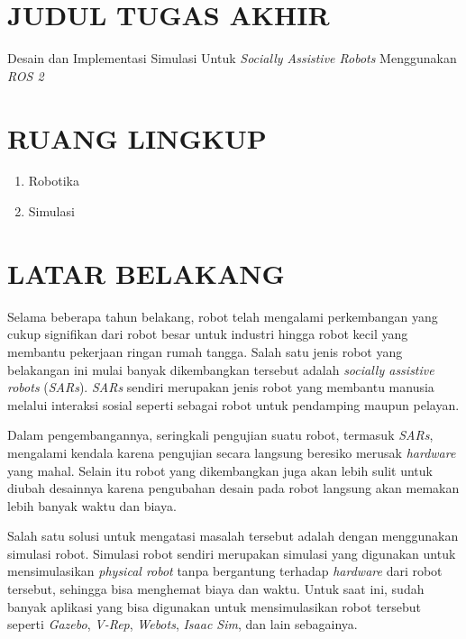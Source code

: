 \section{JUDUL TUGAS AKHIR}

Desain dan Implementasi Simulasi Untuk \emph{Socially Assistive Robots} Menggunakan \emph{ROS 2}
\vspace{0.5ex}

\section{RUANG LINGKUP}

\begin{enumerate}[nolistsep]
  \item Robotika
  \item Simulasi
\end{enumerate}

\section{LATAR BELAKANG}

Selama beberapa tahun belakang, robot telah mengalami perkembangan yang cukup signifikan dari robot besar untuk industri hingga robot kecil yang membantu pekerjaan ringan rumah tangga.
Salah satu jenis robot yang belakangan ini mulai banyak dikembangkan tersebut adalah \emph{socially assistive robots} (\emph{SARs}).
\emph{SARs} sendiri merupakan jenis robot yang membantu manusia melalui interaksi sosial seperti sebagai robot untuk pendamping maupun pelayan.

Dalam pengembangannya, seringkali pengujian suatu robot, termasuk \emph{SARs}, mengalami kendala karena pengujian secara langsung beresiko merusak \emph{hardware} yang mahal.
Selain itu robot yang dikembangkan juga akan lebih sulit untuk diubah desainnya karena pengubahan desain pada robot langsung akan memakan lebih banyak waktu dan biaya.

Salah satu solusi untuk mengatasi masalah tersebut adalah dengan menggunakan simulasi robot.
Simulasi robot sendiri merupakan simulasi yang digunakan untuk mensimulasikan \emph{physical robot} tanpa bergantung terhadap \emph{hardware} dari robot tersebut, sehingga bisa menghemat biaya dan waktu.
Untuk saat ini, sudah banyak aplikasi yang bisa digunakan untuk mensimulasikan robot tersebut seperti \emph{Gazebo}, \emph{V-Rep}, \emph{Webots}, \emph{Isaac Sim}, dan lain sebagainya.


